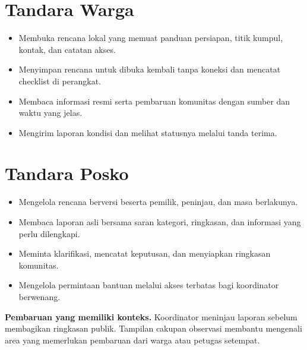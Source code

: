 \documentclass[10pt,a4paper]{article}
\begin{document}
\begin{minipage}[t]{.48\linewidth}\vspace{0pt}\raggedright
\section*{Tandara Warga}
\begin{itemize}
\item Membuka rencana lokal yang memuat panduan persiapan, titik kumpul, kontak, dan catatan akses.
\item Menyimpan rencana untuk dibuka kembali tanpa koneksi dan mencatat checklist di perangkat.
\item Membaca informasi resmi serta pembaruan komunitas dengan sumber dan waktu yang jelas.
\item Mengirim laporan kondisi dan melihat statusnya melalui tanda terima.
\end{itemize}
\end{minipage}\hfill
\begin{minipage}[t]{.48\linewidth}\vspace{0pt}\raggedright
\section*{Tandara Posko}
\begin{itemize}
\item Mengelola rencana berversi beserta pemilik, peninjau, dan masa berlakunya.
\item Membaca laporan asli bersama saran kategori, ringkasan, dan informasi yang perlu dilengkapi.
\item Meminta klarifikasi, mencatat keputusan, dan menyiapkan ringkasan komunitas.
\item Mengelola permintaan bantuan melalui akses terbatas bagi koordinator berwenang.
\end{itemize}
\end{minipage}

\begin{WhiteBox}
\textbf{Pembaruan yang memiliki konteks.} Koordinator meninjau laporan sebelum membagikan ringkasan publik. Tampilan cakupan observasi membantu mengenali area yang memerlukan pembaruan dari warga atau petugas setempat.
\end{WhiteBox}
\newpage

\begin{center}\end{center}
\end{document}
